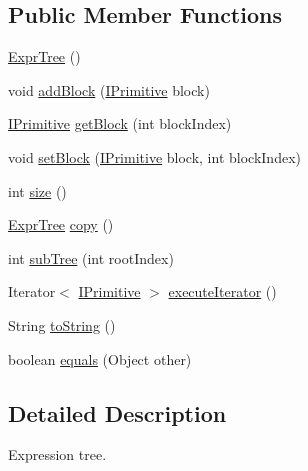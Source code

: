 \subsection*{Public Member Functions}
\begin{DoxyCompactItemize}
\item 
\hyperlink{classnet_1_1sf_1_1jclec_1_1exprtree_1_1_expr_tree_a85c2c8dfa902edb3aa5072222b990bda}{Expr\-Tree} ()
\item 
void \hyperlink{classnet_1_1sf_1_1jclec_1_1exprtree_1_1_expr_tree_afe0d2782c07ec7535af397f988e498cf}{add\-Block} (\hyperlink{interfacenet_1_1sf_1_1jclec_1_1exprtree_1_1_i_primitive}{I\-Primitive} block)
\item 
\hyperlink{interfacenet_1_1sf_1_1jclec_1_1exprtree_1_1_i_primitive}{I\-Primitive} \hyperlink{classnet_1_1sf_1_1jclec_1_1exprtree_1_1_expr_tree_a1dce5503763804028585f66df548fb57}{get\-Block} (int block\-Index)
\item 
void \hyperlink{classnet_1_1sf_1_1jclec_1_1exprtree_1_1_expr_tree_af746344b2364363781a393238e6ec81a}{set\-Block} (\hyperlink{interfacenet_1_1sf_1_1jclec_1_1exprtree_1_1_i_primitive}{I\-Primitive} block, int block\-Index)
\item 
int \hyperlink{classnet_1_1sf_1_1jclec_1_1exprtree_1_1_expr_tree_ace3e27d755f5eb9f8085f418f17b8bf4}{size} ()
\item 
\hyperlink{classnet_1_1sf_1_1jclec_1_1exprtree_1_1_expr_tree}{Expr\-Tree} \hyperlink{classnet_1_1sf_1_1jclec_1_1exprtree_1_1_expr_tree_aa045415684bf4b6561c4f9181a5bd51c}{copy} ()
\item 
int \hyperlink{classnet_1_1sf_1_1jclec_1_1exprtree_1_1_expr_tree_a382dcb6253aa6413996360a4f06f112f}{sub\-Tree} (int root\-Index)
\item 
Iterator$<$ \hyperlink{interfacenet_1_1sf_1_1jclec_1_1exprtree_1_1_i_primitive}{I\-Primitive} $>$ \hyperlink{classnet_1_1sf_1_1jclec_1_1exprtree_1_1_expr_tree_a217aa20e10a46a89e0a1a1d5d12abd63}{execute\-Iterator} ()
\item 
String \hyperlink{classnet_1_1sf_1_1jclec_1_1exprtree_1_1_expr_tree_a4123b9cc1de989e37815c1d229b00528}{to\-String} ()
\item 
boolean \hyperlink{classnet_1_1sf_1_1jclec_1_1exprtree_1_1_expr_tree_ac3efbfd612ef016a6a028f426530ea53}{equals} (Object other)
\end{DoxyCompactItemize}


\subsection{Detailed Description}
Expression tree.

